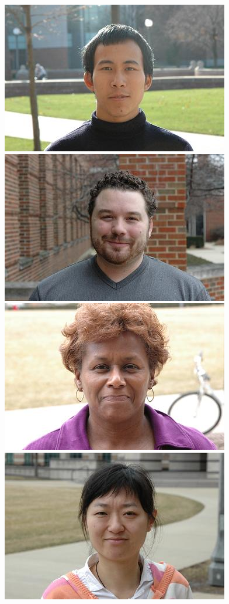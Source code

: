 \documentclass[12pt,journal,draftcls,letterpaper,onecolumn]{IEEEtran}
\begin{document}
\begin{figure}
\includegraphics[scale=0.75,clip=true]{figures_pami/uiuc_example/normal_outdoor/DSC_1641.JPG}
\includegraphics[scale=0.75,clip=true]{figures_pami/uiuc_example/normal_outdoor/DSC_3522.JPG}
\includegraphics[scale=0.75,clip=true]{figures_pami/uiuc_example/normal_outdoor/DSC_3707.JPG}
\includegraphics[scale=0.75,clip=true]{figures_pami/uiuc_example/normal_outdoor/DSC_3772.JPG} \\

\end{figure}
\end{document}
